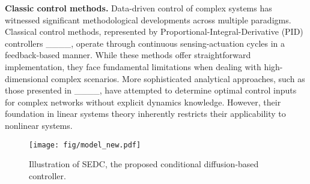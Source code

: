 \textbf{Classic control methods.} Data-driven control of complex systems has witnessed significant methodological developments across multiple paradigms. 
Classical control methods, represented by Proportional-Integral-Derivative (PID) controllers ____, operate through continuous sensing-actuation cycles in a feedback-based manner. While these methods offer straightforward implementation, they face fundamental limitations when dealing with high-dimensional complex scenarios. More sophisticated analytical approaches, such as those presented in ____, have attempted to determine optimal control inputs for complex networks without explicit dynamics knowledge. However, their foundation in linear systems theory inherently restricts their applicability to nonlinear systems.

\begin{figure*}[htbp]
    \begin{center}
    \texttt{[image: fig/model\_new.pdf]}    
    \vspace{-10pt}
    \caption{Illustration of SEDC, the proposed conditional diffusion-based controller.}
    \label{fig:model}
    \end{center}

\end{figure*}

